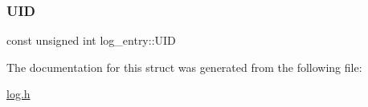 \mbox{\label{structlog__entry_a879f3cffed87111c14b5ddca7bf36bfe_a879f3cffed87111c14b5ddca7bf36bfe}} 
\subsubsection{\texorpdfstring{U\+ID}{UID}}
{\footnotesize\ttfamily const unsigned int log\+\_\+entry\+::\+U\+ID}



The documentation for this struct was generated from the following file\+:\begin{DoxyCompactItemize}
\item 
\hyperlink{log_8h}{log.\+h}\end{DoxyCompactItemize}
